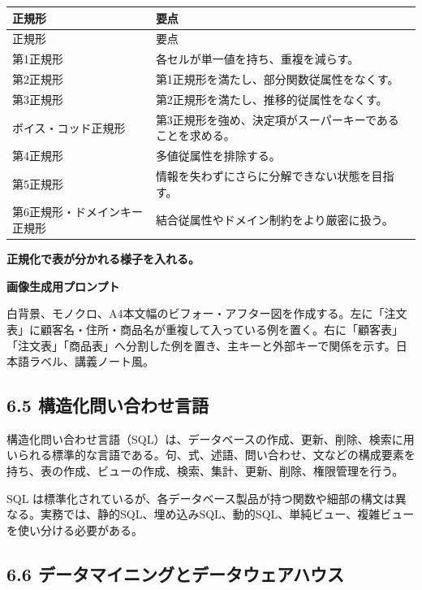 \documentclass[a4paper,11pt]{ltjsarticle}
\begin{document}
\begin{longtable}{>{\raggedright\arraybackslash}p{}>{\raggedright\arraybackslash}p{}}
\toprule
正規形 & 要点 \\
\midrule
\endfirsthead
\toprule
正規形 & 要点 \\
\midrule
\endhead
第1正規形 & 各セルが単一値を持ち、重複を減らす。 \\
第2正規形 & 第1正規形を満たし、部分関数従属性をなくす。 \\
第3正規形 & 第2正規形を満たし、推移的従属性をなくす。 \\
ボイス・コッド正規形 & 第3正規形を強め、決定項がスーパーキーであることを求める。 \\
第4正規形 & 多値従属性を排除する。 \\
第5正規形 & 情報を失わずにさらに分解できない状態を目指す。 \\
第6正規形・ドメインキー正規形 & 結合従属性やドメイン制約をより厳密に扱う。 \\
\bottomrule
\end{longtable}

\begin{todobox}
\textbf{正規化で表が分かれる様子を入れる。}\par
\textbf{画像生成用プロンプト}\par
白背景、モノクロ、A4本文幅のビフォー・アフター図を作成する。左に「注文表」に顧客名・住所・商品名が重複して入っている例を置く。右に「顧客表」「注文表」「商品表」へ分割した例を置き、主キーと外部キーで関係を示す。日本語ラベル、講義ノート風。

\end{todobox}

\subsection{6.5 構造化問い合わせ言語}

構造化問い合わせ言語（SQL）は、データベースの作成、更新、削除、検索に用いられる標準的な言語である。句、式、述語、問い合わせ、文などの構成要素を持ち、表の作成、ビューの作成、検索、集計、更新、削除、権限管理を行う。

SQL は標準化されているが、各データベース製品が持つ関数や細部の構文は異なる。実務では、静的SQL、埋め込みSQL、動的SQL、単純ビュー、複雑ビューを使い分ける必要がある。

\subsection{6.6 データマイニングとデータウェアハウス}
\end{document}
